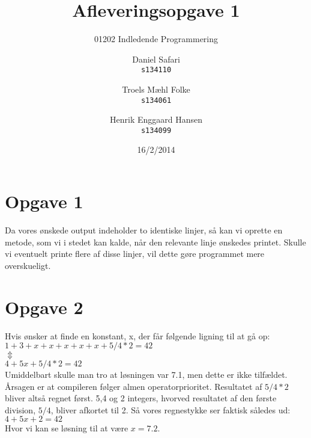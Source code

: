 \documentclass{scrartcl}
\begin{document}

\title{Afleveringsopgave 1}
\subtitle{01202 Indledende Programmering}
\author{
  Daniel Safari\\
  \texttt{s134110}
  \and
  Troels Mæhl Folke\\
  \texttt{s134061}
   \and
  Henrik Enggaard Hansen\\
  \texttt{s134099}
}
\date{16/2/2014}
\maketitle

\section*{Opgave 1}
Da vores ønskede output indeholder to identiske linjer, så kan vi oprette en metode, som vi i stedet kan kalde, når den relevante linje ønskedes printet. Skulle vi eventuelt printe flere af disse linjer, vil dette gøre programmet mere overskueligt.

\section*{Opgave 2}
Hvis ønsker at finde en konstant, x, der får følgende ligning til at gå op: 
\vspace{10pt}
\\
\hspace*{30pt}$1+3+x+x+x+x+x+5/4*2=42$
\\
\hspace*{30pt}$\Updownarrow$
\\
\hspace*{30pt}$4+5x+5/4*2 = 42$
\vspace{10pt}
\\
Umiddelbart skulle man tro at løsningen var 7.1, men dette er ikke tilfældet. Årsagen er at compileren følger almen operatorprioritet. Resultatet af $5/4*2$ bliver altså regnet først. 5,4 og 2 integers, hvorved resultatet af den første division, $5/4$, bliver afkortet til 2. Så vores regnestykke ser faktisk således ud:
\vspace{10pt}
\\
\hspace*{30pt}$4+5x+2 = 42$
\vspace{10pt}
\\
Hvor vi kan se løsning til at være $x=7.2$.
\end{document}
